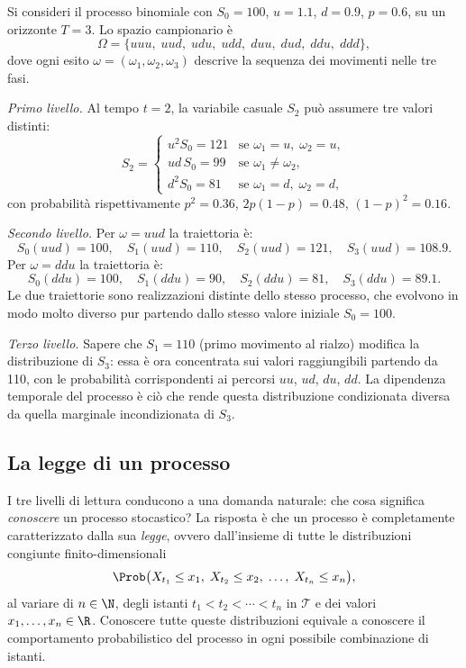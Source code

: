 \begin{example}
\label{es:tre-livelli}
Si consideri il processo binomiale con $S_0=100$, $u=1.1$, $d=0.9$,
$p=0.6$, su un orizzonte $T=3$. Lo spazio campionario \`{e}
\[
\Omega=\{uuu,\;uud,\;udu,\;udd,\;duu,\;dud,\;ddu,\;ddd\},
\]
dove ogni esito $\omega=(\omega_1,\omega_2,\omega_3)$ descrive la
sequenza dei movimenti nelle tre fasi.

\emph{Primo livello.} Al tempo $t=2$, la variabile casuale $S_2$
pu\`{o} assumere tre valori distinti:
\[
S_2=\begin{cases}
u^2 S_0=121 & \text{se }\omega_1=u,\;\omega_2=u,\\
ud\,S_0=99 & \text{se }\omega_1\neq\omega_2,\\
d^2 S_0=81 & \text{se }\omega_1=d,\;\omega_2=d,
\end{cases}
\]
con probabilit\`{a} rispettivamente $p^2=0.36$, $2p(1-p)=0.48$,
$(1-p)^2=0.16$.

\emph{Secondo livello.} Per $\omega=uud$ la traiettoria \`{e}:
\[
S_0(uud)=100,\quad S_1(uud)=110,\quad S_2(uud)=121,\quad
S_3(uud)=108.9.
\]
Per $\omega=ddu$ la traiettoria \`{e}:
\[
S_0(ddu)=100,\quad S_1(ddu)=90,\quad S_2(ddu)=81,\quad
S_3(ddu)=89.1.
\]
Le due traiettorie sono realizzazioni distinte dello stesso processo,
che evolvono in modo molto diverso pur partendo dallo stesso valore
iniziale $S_0=100$.

\emph{Terzo livello.} Sapere che $S_1=110$ (primo movimento al
rialzo) modifica la distribuzione di $S_3$: essa \`{e} ora concentrata
sui valori raggiungibili partendo da 110, con le probabilit\`{a}
corrispondenti ai percorsi $uu$, $ud$, $du$, $dd$. La dipendenza
temporale del processo \`{e} ci\`{o} che rende questa distribuzione
condizionata diversa da quella marginale incondizionata di $S_3$.
\end{example}

\subsection{La legge di un processo}

\noindent
I tre livelli di lettura conducono a una domanda naturale: che cosa
significa \emph{conoscere} un processo stocastico? La risposta \`{e}
che un processo \`{e} completamente caratterizzato dalla sua
\emph{legge}, ovvero dall'insieme di tutte le distribuzioni congiunte
finito-dimensionali
\[
\Prob\bigl(X_{t_1}\leq x_1,\;X_{t_2}\leq x_2,\;\ldots,\;
X_{t_n}\leq x_n\bigr),
\]
al variare di $n\in\N$, degli istanti $t_1<t_2<\cdots<t_n$ in
$\mathcal{T}$ e dei valori $x_1,\ldots,x_n\in\R$. Conoscere tutte
queste distribuzioni equivale a conoscere il comportamento
probabilistico del processo in ogni possibile combinazione di
istanti.

